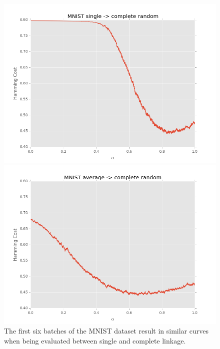 \begin{figure}[h]
\centering
\begin{minipage}{.45\textwidth}
  \centering
  \includegraphics[width=\linewidth]{images/mnist-sc-random}
\end{minipage}
\begin{minipage}{.45\textwidth}
  \centering
  \includegraphics[width=\linewidth]{images/mnist-ac-random}
\end{minipage}
\caption{The first six batches of the MNIST dataset result in similar curves when being evaluated between single and complete linkage.}
\label{fig:mnist1000sc}
\end{figure}
